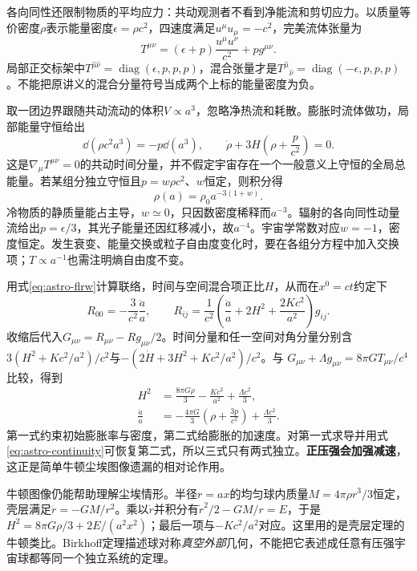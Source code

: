 各向同性还限制物质的平均应力：共动观测者不看到净能流和剪切应力。以质量等价密度$\rho$表示能量密度$\epsilon=\rho c^2$，四速度满足$u^\mu u_\mu=-c^2$，完美流体张量为
\[
 T^{\mu\nu}=(\epsilon+p)\frac{u^\mu u^\nu}{c^2}+p g^{\mu\nu}.
\]
局部正交标架中$T^{\hat\mu\hat\nu}=\operatorname{diag}(\epsilon,p,p,p)$，混合张量才是$T^{\hat\mu}{}_{\hat\nu}=\operatorname{diag}(-\epsilon,p,p,p)$。不能把原讲义的混合分量符号当成两个上标的能量密度为负。

取一团边界跟随共动流动的体积$V\propto a^3$，忽略净热流和耗散。膨胀时流体做功，局部能量守恒给出
\begin{equation}\label{eq:astro-continuity}
 \dd(\rho c^2a^3)=-p\dd(a^3),\qquad
 \dot\rho+3H\left(\rho+\frac p{c^2}\right)=0.
\end{equation}
这是$\nabla_\mu T^{\mu\nu}=0$的共动时间分量，并不假定宇宙存在一个一般意义上守恒的全局总能量。若某组分独立守恒且$p=w\rho c^2$、$w$恒定，则积分得
\[
 \rho(a)=\rho_0 a^{-3(1+w)}.
\]
冷物质的静质量能占主导，$w\simeq0$，只因数密度稀释而$a^{-3}$。辐射的各向同性动量流给出$p=\epsilon/3$，其光子能量还因红移减小，故$a^{-4}$。宇宙学常数对应$w=-1$，密度恒定。发生衰变、能量交换或粒子自由度变化时，要在各组分方程中加入交换项；$T\propto a^{-1}$也需注明熵自由度不变。

用式\eqref{eq:astro-flrw}计算联络，时间与空间混合项正比$H$，从而在$x^0=ct$约定下
\[
 R_{00}=-\frac{3}{c^2}\frac{\ddot a}{a},\qquad
 R_{ij}=\frac1{c^2}\left(\frac{\ddot a}{a}+2H^2+\frac{2Kc^2}{a^2}\right)g_{ij}.
\]
收缩后代入$G_{\mu\nu}=R_{\mu\nu}-Rg_{\mu\nu}/2$。时间分量和任一空间对角分量分别含$3(H^2+Kc^2/a^2)/c^2$与$-(2\dot H+3H^2+Kc^2/a^2)/c^2$。与
$G_{\mu\nu}+\Lambda g_{\mu\nu}=8\pi GT_{\mu\nu}/c^4$比较，得到
\begin{align}
 H^2&=\frac{8\pi G\rho}{3}-\frac{Kc^2}{a^2}+\frac{\Lambda c^2}{3},\label{eq:astro-friedmann}\\
 \frac{\ddot a}{a}&=-\frac{4\pi G}{3}\left(\rho+\frac{3p}{c^2}\right)+\frac{\Lambda c^2}{3}.\label{eq:astro-acceleration}
\end{align}
第一式约束初始膨胀率与密度，第二式给膨胀的加速度。对第一式求导并用式\eqref{eq:astro-continuity}可恢复第二式，所以三式只有两式独立。\textbf{正压强会加强减速}，这正是简单牛顿尘埃图像遗漏的相对论作用。

牛顿图像仍能帮助理解尘埃情形。半径$r=a x$的均匀球内质量$M=4\pi\rho r^3/3$恒定，壳层满足$\ddot r=-GM/r^2$。乘以$\dot r$并积分有$\dot r^2/2-GM/r=E$，于是$H^2=8\pi G\rho/3+2E/(a^2x^2)$；最后一项与$-Kc^2/a^2$对应。这里用的是壳层定理的牛顿类比。Birkhoff定理描述球对称\emph{真空外部}几何，不能把它表述成任意有压强宇宙球都等同一个独立系统的定理。

